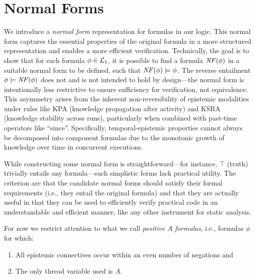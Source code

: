 \section{Normal Forms}
We introduce a \emph{normal form} representation for formulas in our logic. This normal form captures the essential properties of the original formula in a more structured representation and enables a more efficient verification.
Technically, the goal is to show that for each formula $\phi\in\mathcal{L}_1$, it is possible to find a formula $\mathit{NF}(\phi)$ in a suitable normal form to be defined, such that $\mathit{NF}(\phi)\models \phi$.
The reverse entailment $\phi\models \mathit{NF}(\phi)$ does not and is not intended to hold by design---the normal form is intentionally less restrictive to ensure sufficiency for verification, not equivalence. This asymmetry arises from the inherent non-reversibility of epistemic modalities under rules like {\sc KPA} (knowledge propagation after activity) and {\sc KSRA} (knowledge stability across runs), particularly when combined with past-time operators like ``since''. Specifically, temporal-epistemic properties cannot always be decomposed into component formulas due to the monotonic growth of knowledge over time in concurrent executions.

While constructing some normal form is straightforward---for instance, 
$\top$ (truth) trivially entails any formula---such simplistic forms lack practical utility. The criterion are that the candidate normal forms should satisfy their formal requirements (i.e., they entail the original formula) and that they are actually useful in that they can be used to efficiently verify practical code in an understandable and efficient manner, like any other instrument for static analysis.

For now we restrict attention to what we call \emph{positive $A$ formulas}, i.e., formulas $\phi$ for which:

\begin{enumerate}
\item All epistemic connectives occur within an even number of negations and
\item The only thread variable used is $A$.
\end{enumerate}

